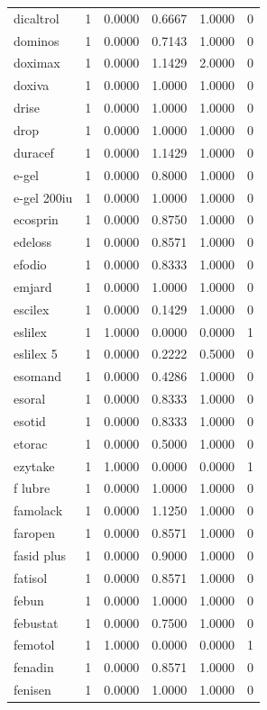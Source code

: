 \begin{longtable}{p{3.0cm}rrrrr}
dicaltrol & 1 & 0.0000 & 0.6667 & 1.0000 & 0 \\
dominos & 1 & 0.0000 & 0.7143 & 1.0000 & 0 \\
doximax & 1 & 0.0000 & 1.1429 & 2.0000 & 0 \\
doxiva & 1 & 0.0000 & 1.0000 & 1.0000 & 0 \\
drise & 1 & 0.0000 & 1.0000 & 1.0000 & 0 \\
drop & 1 & 0.0000 & 1.0000 & 1.0000 & 0 \\
duracef & 1 & 0.0000 & 1.1429 & 1.0000 & 0 \\
e-gel & 1 & 0.0000 & 0.8000 & 1.0000 & 0 \\
e-gel 200iu & 1 & 0.0000 & 1.0000 & 1.0000 & 0 \\
ecosprin & 1 & 0.0000 & 0.8750 & 1.0000 & 0 \\
edeloss & 1 & 0.0000 & 0.8571 & 1.0000 & 0 \\
efodio & 1 & 0.0000 & 0.8333 & 1.0000 & 0 \\
emjard & 1 & 0.0000 & 1.0000 & 1.0000 & 0 \\
escilex & 1 & 0.0000 & 0.1429 & 1.0000 & 0 \\
eslilex & 1 & 1.0000 & 0.0000 & 0.0000 & 1 \\
eslilex 5 & 1 & 0.0000 & 0.2222 & 0.5000 & 0 \\
esomand & 1 & 0.0000 & 0.4286 & 1.0000 & 0 \\
esoral & 1 & 0.0000 & 0.8333 & 1.0000 & 0 \\
esotid & 1 & 0.0000 & 0.8333 & 1.0000 & 0 \\
etorac & 1 & 0.0000 & 0.5000 & 1.0000 & 0 \\
ezytake & 1 & 1.0000 & 0.0000 & 0.0000 & 1 \\
f lubre & 1 & 0.0000 & 1.0000 & 1.0000 & 0 \\
famolack & 1 & 0.0000 & 1.1250 & 1.0000 & 0 \\
faropen & 1 & 0.0000 & 0.8571 & 1.0000 & 0 \\
fasid plus & 1 & 0.0000 & 0.9000 & 1.0000 & 0 \\
fatisol & 1 & 0.0000 & 0.8571 & 1.0000 & 0 \\
febun & 1 & 0.0000 & 1.0000 & 1.0000 & 0 \\
febustat & 1 & 0.0000 & 0.7500 & 1.0000 & 0 \\
femotol & 1 & 1.0000 & 0.0000 & 0.0000 & 1 \\
fenadin & 1 & 0.0000 & 0.8571 & 1.0000 & 0 \\
fenisen & 1 & 0.0000 & 1.0000 & 1.0000 & 0 \\

\end{longtable}
